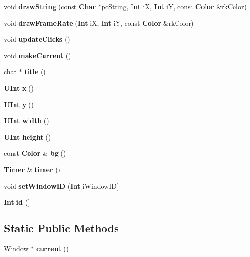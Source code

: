 \begin{CompactItemize}
\item 
void {\bf draw\-String} (const {\bf Char} $\ast$pc\-String, {\bf Int} i\-X, {\bf Int} i\-Y, const {\bf Color} \&rk\-Color)
\item 
void {\bf draw\-Frame\-Rate} ({\bf Int} i\-X, {\bf Int} i\-Y, const {\bf Color} \&rk\-Color)
\item 
void {\bf update\-Clicks} ()
\item 
void {\bf make\-Current} ()
\item 
char $\ast$ {\bf title} ()
\item 
{\bf UInt} {\bf x} ()
\item 
{\bf UInt} {\bf y} ()
\item 
{\bf UInt} {\bf width} ()
\item 
{\bf UInt} {\bf height} ()
\item 
const {\bf Color} \& {\bf bg} ()
\item 
{\bf Timer} \& {\bf timer} ()
\item 
void {\bf set\-Window\-ID} ({\bf Int} i\-Window\-ID)
\item 
{\bf Int} {\bf id} ()
\end{CompactItemize}
\subsection*{Static Public Methods}
\begin{CompactItemize}
\item 
Window $\ast$ {\bf current} ()
\end{CompactItemize}
